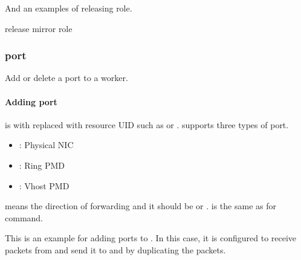 \documentclass[a4paper,11pt,openany,oneside,english]{sphinxmanual}
\begin{document}
And an examples of releasing role.

\begin{sphinxVerbatim}[commandchars=\\\{\},formatcom=\footnotesize]
 release mirror role
\end{sphinxVerbatim}


\subsubsection{port}
\label{\detokenize{commands/secondary/spp_mirror:port}}\label{\detokenize{commands/secondary/spp_mirror:commands-spp-mirror-port}}
Add or delete a port to a worker.


\paragraph{Adding port}
\label{\detokenize{commands/secondary/spp_mirror:adding-port}}
\begin{sphinxVerbatim}[commandchars=\\\{\},formatcom=\footnotesize]
\end{sphinxVerbatim}

 is with replaced with resource UID such as  or
.  supports three types of port.
\begin{itemize}
\item {} 
 : Physical NIC

\item {} 
 : Ring PMD

\item {} 
 : Vhost PMD

\end{itemize}

 means the direction of forwarding and it should be  or .
 is the same as for  command.

This is an example for adding ports to . In this case, it is configured
to receive packets from  and send it to  and 
by duplicating the packets.
\end{document}
